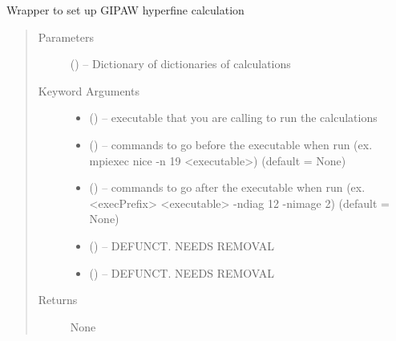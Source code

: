 \documentclass[letterpaper,10pt,english]{sphinxmanual}
\begin{document}
\begin{fulllineitems}
\label{\detokenize{run:run.hyperfine}}
Wrapper to set up GIPAW hyperfine calculation
\begin{quote}\begin{description}
\item[{Parameters}] \leavevmode
{} () -- Dictionary of dictionaries of calculations

\item[{Keyword Arguments}] \leavevmode\begin{itemize}
\item {} 
 () -- executable that you are calling to run the calculations

\item {} 
 () -- commands to go before the executable when run
(ex. mpiexec nice -n 19 \textless{}executable\textgreater{}) (default = None)

\item {} 
 () -- commands to go after the executable when run
(ex. \textless{}execPrefix\textgreater{} \textless{}executable\textgreater{} -ndiag 12 -nimage 2) (default = None)

\item {} 
 () -- DEFUNCT. NEEDS REMOVAL

\item {} 
 () -- DEFUNCT. NEEDS REMOVAL

\end{itemize}

\item[{Returns}] \leavevmode
None

\end{description}\end{quote}

\end{fulllineitems}

\end{document}

